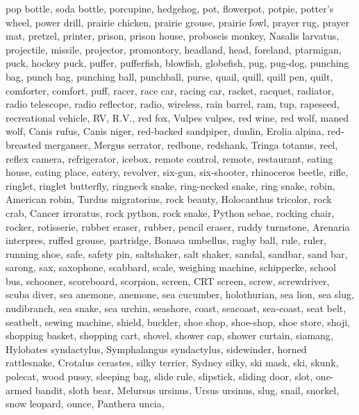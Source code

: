 \documentclass{article}
\begin{document}
{{pop bottle, soda bottle},
{porcupine, hedgehog},
{pot, flowerpot},
{potpie},
{potter's wheel},
{power drill},
{prairie chicken, prairie grouse, prairie fowl},
{prayer rug, prayer mat},
{pretzel},
{printer},
{prison, prison house},
{proboscis monkey, Nasalis larvatus},
{projectile, missile},
{projector},
{promontory, headland, head, foreland},
{ptarmigan},
{puck, hockey puck},
{puffer, pufferfish, blowfish, globefish},
{pug, pug-dog},
{punching bag, punch bag, punching ball, punchball},
{purse},
{quail},
{quill, quill pen},
{quilt, comforter, comfort, puff},
{racer, race car, racing car},
{racket, racquet},
{radiator},
{radio telescope, radio reflector},
{radio, wireless},
{rain barrel},
{ram, tup},
{rapeseed},
{recreational vehicle, RV, R.V.},
{red fox, Vulpes vulpes},
{red wine},
{red wolf, maned wolf, Canis rufus, Canis niger},
{red-backed sandpiper, dunlin, Erolia alpina},
{red-breasted merganser, Mergus serrator},
{redbone},
{redshank, Tringa totanus},
{reel},
{reflex camera},
{refrigerator, icebox},
{remote control, remote},
{restaurant, eating house, eating place, eatery},
{revolver, six-gun, six-shooter},
{rhinoceros beetle},
{rifle},
{ringlet, ringlet butterfly},
{ringneck snake, ring-necked snake, ring snake},
{robin, American robin, Turdus migratorius},
{rock beauty, Holocanthus tricolor},
{rock crab, Cancer irroratus},
{rock python, rock snake, Python sebae},
{rocking chair, rocker},
{rotisserie},
{rubber eraser, rubber, pencil eraser},
{ruddy turnstone, Arenaria interpres},
{ruffed grouse, partridge, Bonasa umbellus},
{rugby ball},
{rule, ruler},
{running shoe},
{safe},
{safety pin},
{saltshaker, salt shaker},
{sandal},
{sandbar, sand bar},
{sarong},
{sax, saxophone},
{scabbard},
{scale, weighing machine},
{schipperke},
{school bus},
{schooner},
{scoreboard},
{scorpion},
{screen, CRT screen},
{screw},
{screwdriver},
{scuba diver},
{sea anemone, anemone},
{sea cucumber, holothurian},
{sea lion},
{sea slug, nudibranch},
{sea snake},
{sea urchin},
{seashore, coast, seacoast, sea-coast},
{seat belt, seatbelt},
{sewing machine},
{shield, buckler},
{shoe shop, shoe-shop, shoe store},
{shoji},
{shopping basket},
{shopping cart},
{shovel},
{shower cap},
{shower curtain},
{siamang, Hylobates syndactylus, Symphalangus syndactylus},
{sidewinder, horned rattlesnake, Crotalus cerastes},
{silky terrier, Sydney silky},
{ski mask},
{ski},
{skunk, polecat, wood pussy},
{sleeping bag},
{slide rule, slipstick},
{sliding door},
{slot, one-armed bandit},
{sloth bear, Melursus ursinus, Ursus ursinus},
{slug},
{snail},
{snorkel},
{snow leopard, ounce, Panthera uncia},
}
\end{document}
